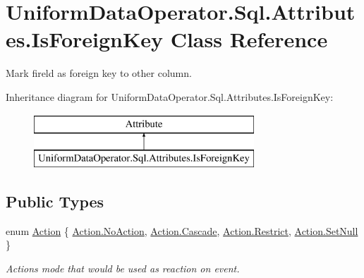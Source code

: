 \hypertarget{class_uniform_data_operator_1_1_sql_1_1_attributes_1_1_is_foreign_key}{}\section{Uniform\+Data\+Operator.\+Sql.\+Attributes.\+Is\+Foreign\+Key Class Reference}
\label{class_uniform_data_operator_1_1_sql_1_1_attributes_1_1_is_foreign_key}


Mark fireld as foreign key to other column.  


Inheritance diagram for Uniform\+Data\+Operator.\+Sql.\+Attributes.\+Is\+Foreign\+Key\+:\begin{figure}[H]
\begin{center}
\leavevmode
\includegraphics[height=2.000000cm]{de/db6/class_uniform_data_operator_1_1_sql_1_1_attributes_1_1_is_foreign_key}
\end{center}
\end{figure}
\subsection*{Public Types}
\begin{DoxyCompactItemize}
\item 
enum \mbox{\hyperlink{class_uniform_data_operator_1_1_sql_1_1_attributes_1_1_is_foreign_key_a6039622384e2bbd1aa386e326ee0f850}{Action}} \{ \mbox{\hyperlink{class_uniform_data_operator_1_1_sql_1_1_attributes_1_1_is_foreign_key_a6039622384e2bbd1aa386e326ee0f850a1e601ea653db1c729c9ee5746730fabe}{Action.\+No\+Action}}, 
\mbox{\hyperlink{class_uniform_data_operator_1_1_sql_1_1_attributes_1_1_is_foreign_key_a6039622384e2bbd1aa386e326ee0f850a2dc2b15e8b0ee7ed3fdd4cf53ad0a8c3}{Action.\+Cascade}}, 
\mbox{\hyperlink{class_uniform_data_operator_1_1_sql_1_1_attributes_1_1_is_foreign_key_a6039622384e2bbd1aa386e326ee0f850a034d70b46e41ec9d0306b0001e04cae7}{Action.\+Restrict}}, 
\mbox{\hyperlink{class_uniform_data_operator_1_1_sql_1_1_attributes_1_1_is_foreign_key_a6039622384e2bbd1aa386e326ee0f850a2ac481dd701d4f580b6b01eb34442e71}{Action.\+Set\+Null}}
 \}
\begin{DoxyCompactList}\small\item\em Action\textquotesingle{}s mode that would be used as reaction on event. \end{DoxyCompactList}\end{DoxyCompactItemize}
